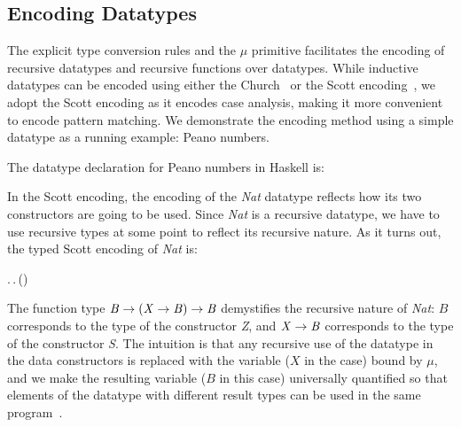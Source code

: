 \subsection{Encoding Datatypes}

The explicit type conversion rules and the $\mu$ primitive facilitates
the encoding of recursive datatypes and recursive functions over
datatypes. While inductive datatypes can be encoded using either the
Church~\cite{tapl} or the Scott encoding~\cite{encoding:scott}, we
adopt the Scott encoding as it encodes case analysis, making it more
convenient to encode pattern matching. We demonstrate the encoding
method using a simple datatype as a running example: Peano numbers.

The datatype declaration for Peano numbers in Haskell is:
\begin{hscode}\SaveRestoreHook
{}%
%
%
\>[4]{}\;\mathrel{=}\mid {}\;\<[E]%
\ColumnHook
\end{hscode}\resethooks
In the Scott encoding, the encoding of the \emph{Nat} datatype
reflects how its two constructors are going to be used. Since
\emph{Nat} is a recursive datatype, we have to use recursive types at
some point to reflect its recursive nature. As it turns out, the typed
Scott encoding of \emph{Nat} is:
\begin{hscode}\SaveRestoreHook
{}%
%
%
\>[3]{}\mu\;\mathbin{:}\star.\,\Pi\;\mathbin{:}\star.\,\to (\to {})\to {}\<[E]%
\ColumnHook
\end{hscode}\resethooks
The function type \ensuremath{\Conid{B}\to (\Conid{X}\to \Conid{B})\to \Conid{B}} demystifies the recursive
nature of \emph{Nat}: $B$ corresponds to the type of the constructor
\emph{Z}, and \ensuremath{\Conid{X}\to \Conid{B}} corresponds to the type of the constructor
\emph{S}. The intuition is that any recursive use of the datatype in
the data constructors is replaced with the variable ($X$ in the case)
bound by $\mu$, and we make the resulting variable ($B$ in this case)
universally quantified so that elements of the datatype with different
result types can be used in the same program~\cite{gadts}.


